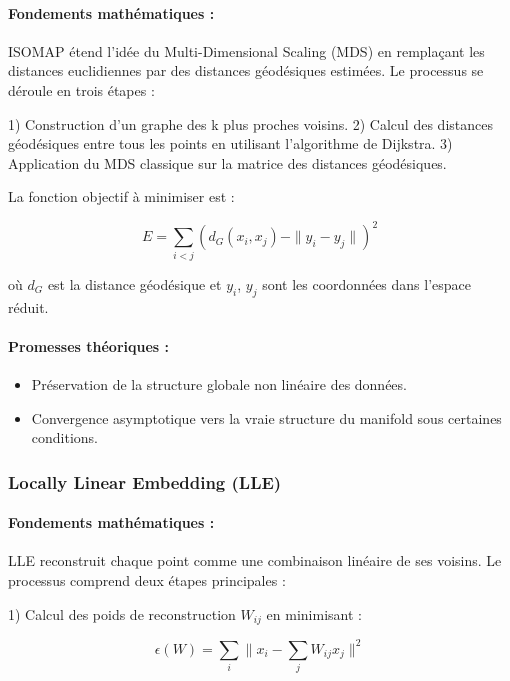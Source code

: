 \documentclass[unnumsec,webpdf,modern,large]{projet_manifold}%
\theoremstyle{thmstyleone}%
\theoremstyle{thmstyletwo}%
\theoremstyle{thmstylethree}%
\begin{document}
\paragraph{Fondements mathématiques :}
ISOMAP étend l'idée du Multi-Dimensional Scaling (MDS) en remplaçant les distances euclidiennes par des distances géodésiques estimées. Le processus se déroule en trois étapes :

1) Construction d'un graphe des k plus proches voisins.
2) Calcul des distances géodésiques entre tous les points en utilisant l'algorithme de Dijkstra.
3) Application du MDS classique sur la matrice des distances géodésiques.

La fonction objectif à minimiser est :

\begin{equation}
    E = \sum_{i<j} (d_G(x_i, x_j) - \|y_i - y_j\|)^2
\end{equation}

où $d_G$ est la distance géodésique et $y_i$, $y_j$ sont les coordonnées dans l'espace réduit.

\paragraph{Promesses théoriques :}
\begin{itemize}
    \item Préservation de la structure globale non linéaire des données.
    \item Convergence asymptotique vers la vraie structure du manifold sous certaines conditions.
    
\end{itemize}

\subsubsection{Locally Linear Embedding (LLE)}

\paragraph{Fondements mathématiques :}
LLE reconstruit chaque point comme une combinaison linéaire de ses voisins. Le processus comprend deux étapes principales :

1) Calcul des poids de reconstruction $W_{ij}$ en minimisant :

\begin{equation}
    \epsilon(W) = \sum_i \|x_i - \sum_j W_{ij}x_j\|^2
\end{equation}
\end{document}
